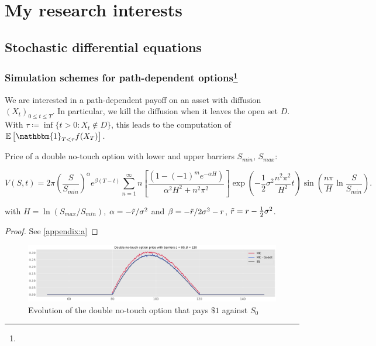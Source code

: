 \section{My research interests}

\subsection{Stochastic differential equations}

\subsubsection*{Simulation schemes for path-dependent options\footnote{}}

We are interested in a path-dependent payoff on an asset with diffusion $(X_t)_{0\leq t \leq T}$.
In particular, we kill the diffusion when it leaves the open set $D$.
\newline With $\tau \coloneqq \inf\{t > 0 : X_t \notin D\}$, this leads to the computation of $\mathbb{E}\left[\mathbbm{1}_{T < \tau} f(X_T)\right].$

\begin{proposition}
    Price of a double no-touch option with lower and upper barriers $S_{min}$, $S_{max}$:


$$V(S,t) = 2\pi \left(\dfrac{S}{S_{min}}\right)^{\alpha} e^{\beta(T-t)} \sum_{n=1}^{\infty} n \left[\dfrac{(1 - (-1)^{m}e^{-\alpha H})}{\alpha^2 H^2 + n^2 \pi^2} \right] \exp \left(-\frac{1}{2}\sigma^2 \dfrac{n^2 \pi^2}{H^2} t \right) \sin \left(\dfrac{n\pi}{H} \ln \frac{S}{S_{min}} \right).$$

with $H=\ln(S_{max}/S_{min})$, $\alpha = -\Tilde{r}/\sigma^2$ and $\beta = -\Tilde{r}/ 2\sigma^2 - r$, $\Tilde{r} = r - \frac{1}{2}\sigma^2$.
\end{proposition}

\begin{proof}
    See \ref{appendix:a}
\end{proof}

\begin{figure}[H]
    \centering
    \includegraphics[width=1\linewidth]{img/dnt_mc.pdf}
    \caption{Evolution of the double no-touch option that pays $\$1$ against $S_0$}
    \label{fig:doublenotouchmc}
\end{figure}

